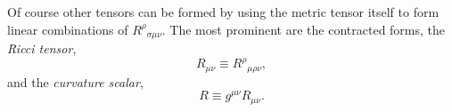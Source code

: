Of course other tensors can be formed by using the metric tensor itself to
form linear combinations of \(R^\rho{}_{\sigma\mu\nu}\). The most prominent
are the contracted forms, the \emph{Ricci tensor},
\begin{equation}
  R_{\mu\nu}
  \equiv
  R^\rho{}_{\mu\rho\nu},
  \tag{6.2.4}\label{eq:6.2.4}
\end{equation}
and the \emph{curvature scalar},
\begin{equation}
  R
  \equiv
  g^{\mu\nu}R_{\mu\nu}.
  \tag{6.2.5}\label{eq:6.2.5}
\end{equation}
